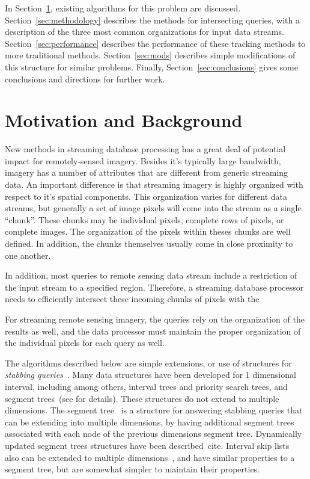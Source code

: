 \documentclass{sig-alternate}
\begin{document}
In Section~\ref{sec:background}, existing algorithms for this problem
are discussed. Section~\ref{sec:methodology} describes the methods for
intersecting queries, with a description of the three most common
organizations for input data streams.  Section~\ref{sec:performance}
describes the performance of these tracking methods to more
traditional methods.  Section~\ref{sec:mods} describes simple
modifications of this structure for similar problems. Finally,
Section~\ref{sec:conclusions} gives some conclusions and directions
for further work.

\section{Motivation and Background}
\label{sec:background}

New methods in streaming database processing has a great deal of
potential impact for remotely-sensed imagery.  Besides it's typically
large bandwidth, imagery has a number of attributes that are different
from generic streaming data.  An important difference is that
streaming imagery is highly organized with respect to it's spatial
components.  This organization varies for different data streams, but
generally a set of image pixels will come into the stream as a single
``chunk''.  These chunks may be individual pixels, complete rows of
pixels, or complete images.  The organization of the pixels within
theses chunks are well defined.  In addition, the chunks themselves
usually come in close proximity to one another.

In addition, most queries to remote sensing data stream include a
restriction of the input stream to a specified region.  Therefore, a
streaming database processor needs to efficiently intersect these
incoming chunks of pixels with the 

For streaming remote sensing imagery, the queries rely on the
organization of the results as well, and the data processor must
maintain the proper organization of the individual pixels for each
query as well.

The algorithms described below are simple extensions, or use of
structures for \emph{stabbing queries}~\cite{samet90}.
Many data structures have been developed for 1 dimensional interval,
including among others, interval trees and priority search trees, and
segment trees~(see \cite{aho74desig-analy,berg00comput-geomet} for
details).  These structures do not extend to multiple dimensions.  The
segment tree~\cite{} is a structure for answering stabbing queries
that can be extending into multiple dimensions, by having additional
segment trees associated with each node of the previous dimensions
segment tree.  Dynamically updated segment trees structures have
been described~cite{}.  Interval skip
lists~\cite{hanson92interval-skip} also can be extended to multiple
dimensions~\cite{nickerson94skip}, and have similar properties to a
segment tree, but are somewhat simpler to maintain their properties.
\end{document}

